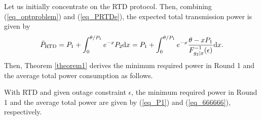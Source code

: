 Let us initially concentrate on the RTD protocol. Then,  combining (\ref{eq_optproblem}) and (\ref{eq_PRTDe}), the expected total transmission power  is given by
\begin{align}\label{eq_barP}
    \Bar{P}_\text{RTD} = P_1 + \int_0^{\theta/P_1} e^{- x}P_2\text{d}x
    = P_1 + \int_0^{\theta/P_1} e^{- x}\frac{\theta-x P_1}{F_{g_2|x}^{-1}(\epsilon)}\text{d}x.
\end{align}
Then, Theorem \ref{theorem1} derives the minimum required power  in Round 1 and the average total power consumption as follows. 



\begin{theorem}\label{theorem1}
With RTD and given outage constraint $\epsilon$, the minimum required power in Round 1 and the average total power are given by (\ref{eq_P1}) and (\ref{eq_666666}), respectively. 
\end{theorem}
